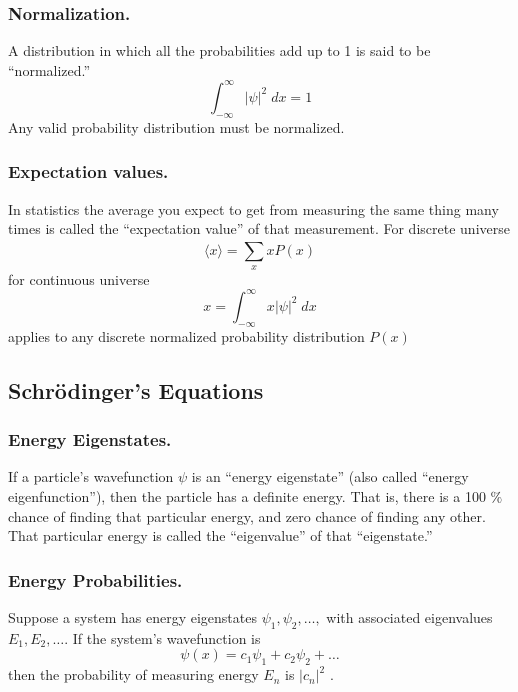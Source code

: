 \documentclass[../main.tex]{subfiles}
\begin{document}
\subsubsection*{Normalization.} A distribution in which all the probabilities add up to 1 is said to be “normalized.” 
\begin{equation*}
    \int_{-\infty}^{\infty}|\psi|^2\;dx=1
\end{equation*}
Any valid probability distribution must be normalized.

\subsubsection*{Expectation values.} In statistics the average you expect to get from measuring the same thing many times is called the “expectation value” of that measurement. For discrete universe
\begin{equation*}
    \langle x\rangle=\sum_{x}^{}xP(x)
\end{equation*}
for continuous universe
\begin{equation*}
    x=\int_{-\infty}^{\infty}x|\psi|^2\;dx
\end{equation*}
applies to any discrete normalized probability distribution $P(x)$

\subsection*{Schrödinger's Equations }
\subsubsection*{Energy Eigenstates.} If a particle's wavefunction $\psi$ is an “energy eigenstate” (also called “energy eigenfunction”), then the particle has a definite energy. That is, there is a 100 $\%$ chance of finding that particular energy, and zero chance of finding any other. That particular energy is called the “eigenvalue” of that “eigenstate.”

\subsubsection*{Energy Probabilities.} Suppose a system has energy eigenstates $\psi_1 , \psi_2,\dots , $ with associated eigenvalues $E_1 ,E_2, \dots$. If the system's wavefunction is
\begin{equation*}
 \psi(x)=c_1\psi_1+c_2\psi_2+\dots
\end{equation*}
then the probability of measuring energy $E_n$ is $|c_n|^2$ .
\end{document}
